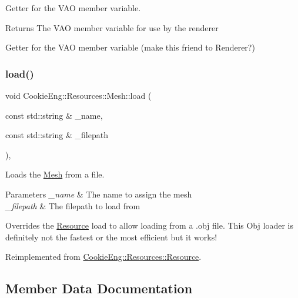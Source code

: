 Getter for the V\+AO member variable. 

\begin{DoxyReturn}{Returns}
The V\+AO member variable for use by the renderer
\end{DoxyReturn}
Getter for the V\+AO member variable (make this friend to Renderer?) \mbox{\label{struct_cookie_eng_1_1_resources_1_1_mesh_ae31053c6edaf0e735d85350bfa6093fb}} 
\subsubsection{\texorpdfstring{load()}{load()}}
{\footnotesize\ttfamily void Cookie\+Eng\+::\+Resources\+::\+Mesh\+::load (\begin{DoxyParamCaption}\item[{const std\+::string \&}]{\+\_\+name,  }\item[{const std\+::string \&}]{\+\_\+filepath }\end{DoxyParamCaption})\hspace{0.3cm}{\ttfamily [override]}, {\ttfamily [virtual]}}



Loads the \hyperlink{struct_cookie_eng_1_1_resources_1_1_mesh}{Mesh} from a file. 


\begin{DoxyParams}{Parameters}
{\em \+\_\+name} & The name to assign the mesh \\
\hline
{\em \+\_\+filepath} & The filepath to load from\\
\hline
\end{DoxyParams}
Overrides the \hyperlink{class_cookie_eng_1_1_resources_1_1_resource}{Resource} load to allow loading from a .obj file. This Obj loader is definitely not the fastest or the most efficient but it works! 

Reimplemented from \hyperlink{class_cookie_eng_1_1_resources_1_1_resource_a75648b8f2e442bebc90d6eb4ea3a2f6e}{Cookie\+Eng\+::\+Resources\+::\+Resource}.



\subsection{Member Data Documentation}
\mbox{\label{struct_cookie_eng_1_1_resources_1_1_mesh_a78ad4658bc848293472999b4708b85ab}} 
